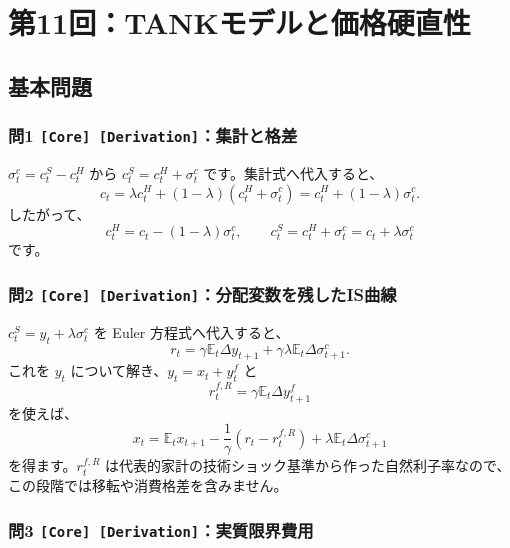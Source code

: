 \documentclass[
  japanese,
  lualatex,
  ja=standard,
  11pt,
  a4paper]{ltjsarticle}
\begin{document}
\clearpage

\section{第11回：TANKモデルと価格硬直性}\label{ux7b2c11ux56detankux30e2ux30c7ux30ebux3068ux4fa1ux683cux786cux76f4ux6027}

\subsection{基本問題}\label{ux57faux672cux554fux984c-10}

\subsubsection{\texorpdfstring{問1
\texttt{{[}Core{]}\ {[}Derivation{]}}：集計と格差}{問1 {[}Core{]} {[}Derivation{]}：集計と格差}}\label{ux554f1-core-derivationux96c6ux8a08ux3068ux683cux5dee}

\(\sigma_t^c=c_t^S-c_t^H\) から \(c_t^S=c_t^H+\sigma_t^c\)
です。集計式へ代入すると、 \[
c_t=\lambda c_t^H+(1-\lambda)(c_t^H+\sigma_t^c)
=c_t^H+(1-\lambda)\sigma_t^c.
\] したがって、 \[
c_t^H=c_t-(1-\lambda)\sigma_t^c,
\qquad
c_t^S=c_t^H+\sigma_t^c=c_t+\lambda\sigma_t^c
\] です。

\subsubsection{\texorpdfstring{問2
\texttt{{[}Core{]}\ {[}Derivation{]}}：分配変数を残したIS曲線}{問2 {[}Core{]} {[}Derivation{]}：分配変数を残したIS曲線}}\label{ux554f2-core-derivationux5206ux914dux5909ux6570ux3092ux6b8bux3057ux305fisux66f2ux7dda}

\(c_t^S=y_t+\lambda\sigma_t^c\) を Euler 方程式へ代入すると、 \[
r_t=\gamma\mathbb E_t\Delta y_{t+1}
+\gamma\lambda\mathbb E_t\Delta\sigma_{t+1}^c.
\] これを \(y_t\) について解き、\(y_t=x_t+y_t^f\) と \[
r_t^{f,R}=\gamma\mathbb E_t\Delta y_{t+1}^f
\] を使えば、 \[
x_t=\mathbb E_tx_{t+1}
-\frac1\gamma(r_t-r_t^{f,R})
+\lambda\mathbb E_t\Delta\sigma_{t+1}^c
\] を得ます。\(r_t^{f,R}\)
は代表的家計の技術ショック基準から作った自然利子率なので、この段階では移転や消費格差を含みません。

\subsubsection{\texorpdfstring{問3
\texttt{{[}Core{]}\ {[}Derivation{]}}：実質限界費用}{問3 {[}Core{]} {[}Derivation{]}：実質限界費用}}\label{ux554f3-core-derivationux5b9fux8ceaux9650ux754cux8cbbux7528}
\end{document}
